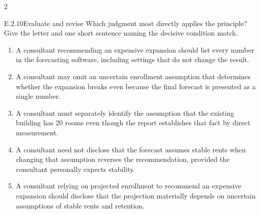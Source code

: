 \documentclass[9pt]{extarticle}
\newcommand{\choice}[1]{\item #1}
\begin{document}
\begin{multicols}{2}
\begin{DenseCoreProblem}{E.2.10}{Evaluate and revise}
Which judgment most directly applies the principle? Give the letter and one short sentence naming the decisive condition match.
\begin{enumerate}[label=(\alph*)]
  \choice{A consultant recommending an expensive expansion should list every number in the forecasting software, including settings that do not change the result.}
  \choice{A consultant may omit an uncertain enrollment assumption that determines whether the expansion breaks even because the final forecast is presented as a single number.}
  \choice{A consultant must separately identify the assumption that the existing building has 20 rooms even though the report establishes that fact by direct measurement.}
  \choice{A consultant need not disclose that the forecast assumes stable rents when changing that assumption reverses the recommendation, provided the consultant personally expects stability.}
  \choice{A consultant relying on projected enrollment to recommend an expensive expansion should disclose that the projection materially depends on uncertain assumptions of stable rents and retention.}
\end{enumerate}
\end{DenseCoreProblem}
\end{multicols}
\CoreWorkArea
\FormBreak
{}
\end{document}
